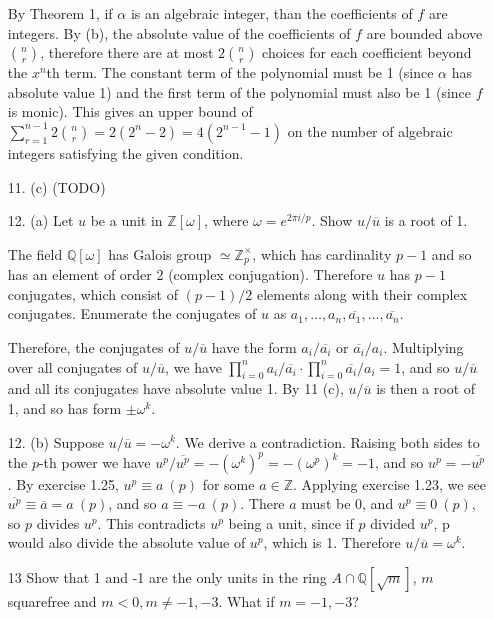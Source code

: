 \documentclass{article}
\newcommand{\w}[0]{\omega}
\newcommand{\Q}[0]{\mathbb{Q}}
\newcommand{\Z}[0]{\mathbb{Z}}
\begin{document}
\begin{enumerate}
By Theorem 1, if $\alpha$ is an algebraic integer, than the coefficients of $f$ are integers.  By (b), the absolute value of the coefficients of $f$ are bounded above $\binom{n}{r}$, therefore there are at most $2\binom{n}{r}$ choices for each coefficient beyond the $x^n$th term.  The constant term of the polynomial must be 1 (since $\alpha$ has absolute value 1) and the first term of the polynomial must also be 1 (since $f$ is monic). This gives an upper bound of $\sum_{r=1}^{n - 1} 2\binom{n}{r} = 2(2^n - 2) = 4(2^{n-1} - 1)$ on the number of algebraic integers satisfying the given condition.

\item[11. (c)]{(TODO)}

\item[12. (a)] Let $u$ be a unit in $\Z[\w]$, where $\w = e^{2\pi i / p}$.  Show $u / \overline{u}$ is a root of 1.

The field $\Q[\w]$ has Galois group $\simeq \Z_p^{\times}$, which has cardinality $p - 1$ and so has an element of order 2 (complex conjugation).  Therefore $u$ has $p - 1$ conjugates, which consist of $(p - 1) / 2$ elements along with their complex conjugates.  Enumerate the conjugates of $u$ as $a_1, \ldots, a_n, \overline{a_1}, \ldots, \overline{a_n}$.

Therefore, the conjugates of $u / \overline{u}$ have the form $a_i / \overline{a_i}$ or $\overline{a_i} / a_i$.  Multiplying over all conjugates of $u / \overline{u}$, we have $\prod_{i = 0}^{n} a_i / \overline{a_i} \cdot \prod_{i = 0}^{n} \overline{a_i} / a_i = 1$, and so $u / \overline{u}$ and all its conjugates have absolute value 1.  By 11 (c), $u / \overline{u}$ is then a root of 1, and so has form $\pm \omega^{k}$.

\item[12. (b)] Suppose $u / \overline{u} = -\omega^{k}$.  We derive a contradiction.  Raising both sides to the $p$-th power we have $u^p / \overline{u^p} = -(\omega^{k})^p = -(\omega^{p})^k = -1$, and so $u^p = -\overline{u^p}$.  By exercise 1.25, $u^p \equiv a\ (p)$ for some $a \in \Z$.  Applying exercise 1.23, we see $\overline{u^p} \equiv \overline{a} = a\ (p)$, and so $a \equiv -a\ (p)$.  There $a$ must be 0, and $u^p \equiv 0\ (p)$, so $p$ divides $u^p$.  This contradicts $u^p$ being a unit, since if $p$ divided $u^p$, p would also divide the absolute value of $u^p$, which is 1.  Therefore $u / \overline{u} = \omega^{k}$.

\item[13] Show that 1 and -1 are the only units in the ring $A \cap \Q[\sqrt{m}]$, $m$ squarefree and $m < 0, m \neq -1, -3$.  What if $m = -1, -3$?


\end{enumerate}
\end{document}
